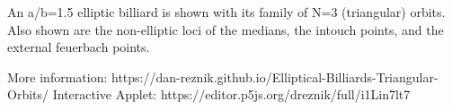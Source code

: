 An a/b=1.5 elliptic billiard is shown with its family of N=3 (triangular) orbits. Also shown are the non-elliptic loci of the medians, the intouch points, and the external feuerbach points.

More information: https://dan-reznik.github.io/Elliptical-Billiards-Triangular-Orbits/
Interactive Applet: https://editor.p5js.org/dreznik/full/i1Lin7lt7